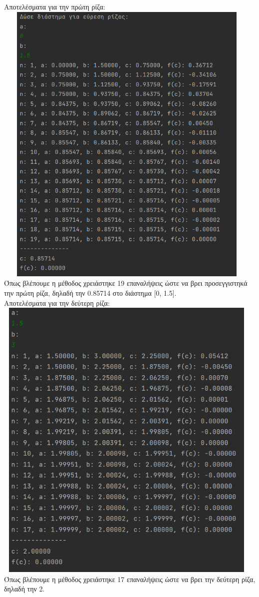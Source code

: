 \documentclass{article}
\begin{document}
Αποτελέσματα για την πρώτη ρίζα: \\
\includegraphics[width=13cm, height=14cm]{images/results_1.png} \\ 
Όπως βλέπουμε η μέθοδος χρειάστηκε 19 επαναλήψεις ώστε να βρει προσεγγιστηκά την πρώτη ρίζα, δηλαδή την 0.85714 στο διάστημα [0, 1.5]. \\ 

Αποτελέσματα για την δεύτερη ρίζα: \\
\includegraphics[width=13cm, height=14cm]{images/results_2.png} \\
Όπως βλέπουμε η μέθοδος χρειάστηκε 17 επαναλήψεις ώστε να βρει την δεύτερη ρίζα, δηλαδή την 2. \\ 
\end{document}
